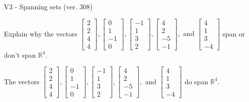 \begin{exercise}
  \begin{exerciseTitle}V3 - Spanning sets (ver. 308)\end{exerciseTitle}
  \begin{exerciseStatement}
    Explain why the vectors \(\left[\begin{array}{r}
2 \\
2 \\
4 \\
4
\end{array}\right] , \left[\begin{array}{r}
0 \\
1 \\
-1 \\
0
\end{array}\right] , \left[\begin{array}{r}
-1 \\
1 \\
3 \\
2
\end{array}\right] , \left[\begin{array}{r}
4 \\
2 \\
-5 \\
-1
\end{array}\right] , \text{ and } \left[\begin{array}{r}
4 \\
1 \\
3 \\
-4
\end{array}\right]\) span or don't span \(\mathbb{R}^4\). 
	


  \end{exerciseStatement}
  \begin{exerciseAnswer}
   The vectors \(\left[\begin{array}{r}
2 \\
2 \\
4 \\
4
\end{array}\right] , \left[\begin{array}{r}
0 \\
1 \\
-1 \\
0
\end{array}\right] , \left[\begin{array}{r}
-1 \\
1 \\
3 \\
2
\end{array}\right] , \left[\begin{array}{r}
4 \\
2 \\
-5 \\
-1
\end{array}\right] , \text{ and } \left[\begin{array}{r}
4 \\
1 \\
3 \\
-4
\end{array}\right]\) 
  	 do  
	span \(\mathbb{R}^4\).
  


  \end{exerciseAnswer}
\end{exercise}